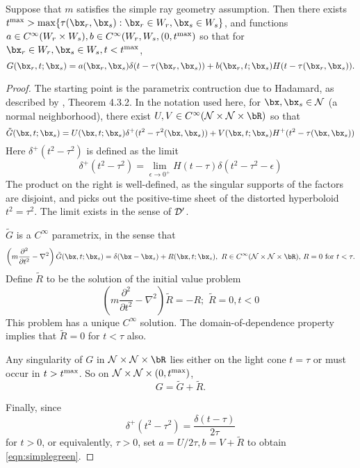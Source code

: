 \begin{theorem}
\label{thm:simplegreen}
Suppose that $m$ satisfies the simple ray geometry assumption. Then there exists $t^{\rm max} >
\max\{\tau(\bx_r,\bx_s): \bx_r \in W_r, \bx_s \in W_s\}$, and 
functions $a \in C^{\infty}(W_r\times W_s), b\in
C^{\infty}(W_r,W_s,(0,t^{\rm max})$ so that for
$\bx_r \in W_r, \bx_s \in W_s, t <t^{\rm max}$,
\begin{equation}
\label{eqn:simplegreen}
G(\bx_r,t;\bx_s) = a(\bx_r,\bx_s)\delta(t-\tau(\bx_r,\bx_s)) + b(\bx_r,t;\bx_s)H(t-\tau(\bx_r,\bx_s)).
\end{equation}
\end{theorem}
\begin{proof}
The starting point is the parametrix contruction due to Hadamard, as described
by \cite{Friedlander:75}, Theorem 4.3.2. In the
notation used here, for $\bx,\bx_s \in {\cal N}$ (a normal
neighborhood), there exist $U, V \in C^{\infty}({\cal N}\times{\cal N}
\times \bR)$ so that
\begin{equation} 
\label{eqn:parametrix}
\tilde{G}(\bx,t;\bx_s) = U(\bx,t;\bx_s)\delta^+(t^2-\tau^2(\bx,\bx_s))
+ V(\bx,t;\bx_s)H^+(t^2-\tau(\bx,\bx_s))
\end{equation}
Here $\delta^+(t^2-\tau^2)$ is defined as the limit
\[
\delta^+(t^2-\tau^2) = \lim_{\epsilon \rightarrow
  0^+}H(t-\tau)\delta(t^2-\tau^2-\epsilon)
\]
The product on the right is well-defined, as the singular supports of
the factors are disjoint, and picks out the positive-time sheet of the
distorted hyperboloid $t^2 = \tau^2$. The limit exists in the sense of
${\cal D}'$.

$\tilde{G}$ is a $C^{\infty}$ parametrix, in the sense that 
\[
\left(m\frac{\partial^2}{\partial
    t^2}-\nabla^2\right)\tilde{G}(\bx,t;\bx_s) =
\delta(\bx-\bx_s) + R(\bx,t;\bx_s), \,\,R \in C^{\infty}({\cal
  N}\times{\cal N}\times \bR),\,R=0 \mbox{ for } t<\tau.
\]
Define $\tilde{R}$ to be the solution of the initial value problem
\[
\left(m\frac{\partial^2}{\partial
    t^2}-\nabla^2\right)\tilde{R} = -R; \,\,\tilde{R}=0, t<0
\]
This problem has a unique $C^{\infty}$ solution. The
domain-of-dependence property implies that $\tilde{R}=0$ for $t <
\tau$ also. 

Any singularity of $G$ in ${\cal N}\times{\cal N}\times \bR$ lies
either on the light cone $t=\tau$ or must occur in $t > t^{\rm
  max}$. So on ${\cal N}\times{\cal N}\times (0,t^{\rm max})$, 
\[
G = \tilde{G} + \tilde{R}.
\]

Finally, since 
\[
\delta^+(t^2-\tau^2) = \frac{\delta(t-\tau)}{2\tau}
\]
for $t>0$, or equivalently, $\tau>0$, set $a = U/2\tau, b = V +
\tilde{R}$ to obtain \ref{eqn:simplegreen}.
\end{proof}

